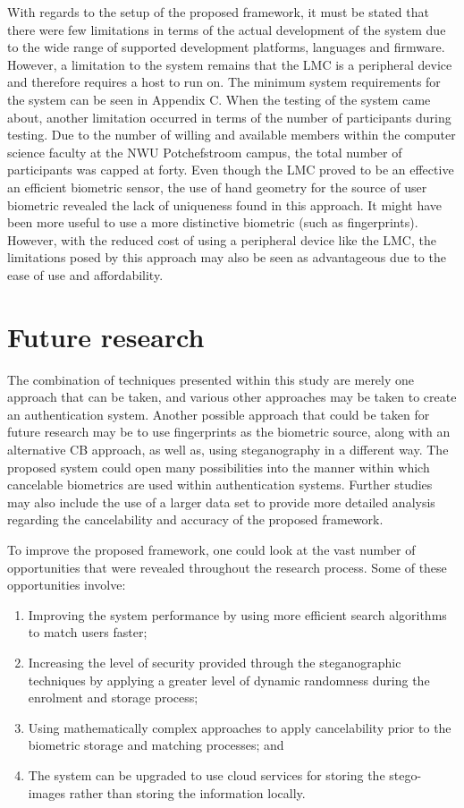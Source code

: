 With regards to the setup of the proposed framework, it must be stated that there were few limitations in terms of the actual development of the system due to the wide range of supported development platforms, languages and firmware. However, a limitation to the system remains that the LMC is a peripheral device and therefore requires a host to run on. The minimum system requirements for the system can be seen in Appendix C.
When the testing of the system came about, another limitation occurred in terms of the number of participants during testing. Due to the number of willing and available members within the computer science faculty at the NWU Potchefstroom campus, the total number of participants was capped at forty. 
Even though the LMC proved to be an effective an efficient biometric sensor, the use of hand geometry for the source of user biometric revealed the lack of uniqueness found in this approach. It might have been more useful to use a more distinctive biometric (such as fingerprints). However, with the reduced cost of using a peripheral device like the LMC, the limitations posed by this approach may also be seen as advantageous due to the ease of use and affordability.


\section{Future research}

The combination of techniques presented within this study are merely one approach that can be taken, and various other approaches may be taken to create an authentication system. Another possible approach that could be taken for future research may be to use fingerprints as the biometric source, along with an alternative CB approach, as well as, using steganography in a different way. The proposed system could open many possibilities into the manner within which cancelable biometrics are used within authentication systems.
Further studies may also include the use of a larger data set to provide more detailed analysis regarding the cancelability and accuracy of the proposed framework.

To improve the proposed framework, one could look at the vast number of opportunities that were revealed throughout the research process. Some of these opportunities involve: 


\begin{enumerate}[label=\roman*.]
    \item Improving the system performance by using more efficient search algorithms to match users faster;
    \item Increasing the level of security provided through the steganographic techniques by applying a greater level of dynamic randomness during the enrolment and storage process; 
    \item Using mathematically complex approaches to apply cancelability prior to the biometric storage and matching processes; and
    \item The system can be upgraded to use cloud services for storing the stego-images rather than storing the information locally.
\end{enumerate}

